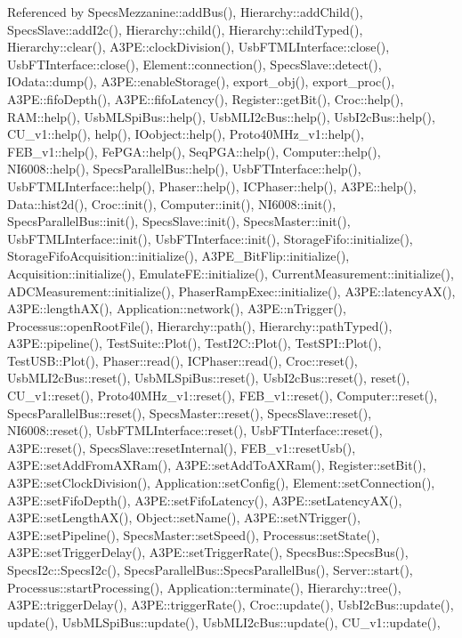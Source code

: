 Referenced by Specs\+Mezzanine\+::add\+Bus(), Hierarchy\+::add\+Child(), Specs\+Slave\+::add\+I2c(), Hierarchy\+::child(), Hierarchy\+::child\+Typed(), Hierarchy\+::clear(), A3\+P\+E\+::clock\+Division(), Usb\+F\+T\+M\+L\+Interface\+::close(), Usb\+F\+T\+Interface\+::close(), Element\+::connection(), Specs\+Slave\+::detect(), I\+Odata\+::dump(), A3\+P\+E\+::enable\+Storage(), export\+\_\+obj(), export\+\_\+proc(), A3\+P\+E\+::fifo\+Depth(), A3\+P\+E\+::fifo\+Latency(), Register\+::get\+Bit(), Croc\+::help(), R\+A\+M\+::help(), Usb\+M\+L\+Spi\+Bus\+::help(), Usb\+M\+L\+I2c\+Bus\+::help(), Usb\+I2c\+Bus\+::help(), C\+U\+\_\+v1\+::help(), help(), I\+Oobject\+::help(), Proto40\+M\+Hz\+\_\+v1\+::help(), F\+E\+B\+\_\+v1\+::help(), Fe\+P\+G\+A\+::help(), Seq\+P\+G\+A\+::help(), Computer\+::help(), N\+I6008\+::help(), Specs\+Parallel\+Bus\+::help(), Usb\+F\+T\+Interface\+::help(), Usb\+F\+T\+M\+L\+Interface\+::help(), Phaser\+::help(), I\+C\+Phaser\+::help(), A3\+P\+E\+::help(), Data\+::hist2d(), Croc\+::init(), Computer\+::init(), N\+I6008\+::init(), Specs\+Parallel\+Bus\+::init(), Specs\+Slave\+::init(), Specs\+Master\+::init(), Usb\+F\+T\+M\+L\+Interface\+::init(), Usb\+F\+T\+Interface\+::init(), Storage\+Fifo\+::initialize(), Storage\+Fifo\+Acquisition\+::initialize(), A3\+P\+E\+\_\+\+Bit\+Flip\+::initialize(), Acquisition\+::initialize(), Emulate\+F\+E\+::initialize(), Current\+Measurement\+::initialize(), A\+D\+C\+Measurement\+::initialize(), Phaser\+Ramp\+Exec\+::initialize(), A3\+P\+E\+::latency\+A\+X(), A3\+P\+E\+::length\+A\+X(), Application\+::network(), A3\+P\+E\+::n\+Trigger(), Processus\+::open\+Root\+File(), Hierarchy\+::path(), Hierarchy\+::path\+Typed(), A3\+P\+E\+::pipeline(), Test\+Suite\+::\+Plot(), Test\+I2\+C\+::\+Plot(), Test\+S\+P\+I\+::\+Plot(), Test\+U\+S\+B\+::\+Plot(), Phaser\+::read(), I\+C\+Phaser\+::read(), Croc\+::reset(), Usb\+M\+L\+I2c\+Bus\+::reset(), Usb\+M\+L\+Spi\+Bus\+::reset(), Usb\+I2c\+Bus\+::reset(), reset(), C\+U\+\_\+v1\+::reset(), Proto40\+M\+Hz\+\_\+v1\+::reset(), F\+E\+B\+\_\+v1\+::reset(), Computer\+::reset(), Specs\+Parallel\+Bus\+::reset(), Specs\+Master\+::reset(), Specs\+Slave\+::reset(), N\+I6008\+::reset(), Usb\+F\+T\+M\+L\+Interface\+::reset(), Usb\+F\+T\+Interface\+::reset(), A3\+P\+E\+::reset(), Specs\+Slave\+::reset\+Internal(), F\+E\+B\+\_\+v1\+::reset\+Usb(), A3\+P\+E\+::set\+Add\+From\+A\+X\+Ram(), A3\+P\+E\+::set\+Add\+To\+A\+X\+Ram(), Register\+::set\+Bit(), A3\+P\+E\+::set\+Clock\+Division(), Application\+::set\+Config(), Element\+::set\+Connection(), A3\+P\+E\+::set\+Fifo\+Depth(), A3\+P\+E\+::set\+Fifo\+Latency(), A3\+P\+E\+::set\+Latency\+A\+X(), A3\+P\+E\+::set\+Length\+A\+X(), Object\+::set\+Name(), A3\+P\+E\+::set\+N\+Trigger(), A3\+P\+E\+::set\+Pipeline(), Specs\+Master\+::set\+Speed(), Processus\+::set\+State(), A3\+P\+E\+::set\+Trigger\+Delay(), A3\+P\+E\+::set\+Trigger\+Rate(), Specs\+Bus\+::\+Specs\+Bus(), Specs\+I2c\+::\+Specs\+I2c(), Specs\+Parallel\+Bus\+::\+Specs\+Parallel\+Bus(), Server\+::start(), Processus\+::start\+Processing(), Application\+::terminate(), Hierarchy\+::tree(), A3\+P\+E\+::trigger\+Delay(), A3\+P\+E\+::trigger\+Rate(), Croc\+::update(), Usb\+I2c\+Bus\+::update(), update(), Usb\+M\+L\+Spi\+Bus\+::update(), Usb\+M\+L\+I2c\+Bus\+::update(), C\+U\+\_\+v1\+::update(), 